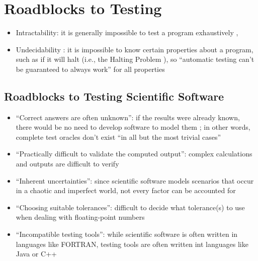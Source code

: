 \section{Roadblocks to Testing}

\begin{itemize}
      \item Intractability: it is generally impossible to test a program
            exhaustively \cite[p.~421]{van_vliet_software_2000},
            \cite[pp.~439,461]{peters_software_2000}
      \item Undecidability \cite[p.~439]{peters_software_2000}: it is
            impossible to know certain properties about a program, such as if
            it will halt (i.e., the Halting Problem
            \cite[p.~4]{gurfinkel_testing_2017}), so ``automatic testing
            can't be guaranteed to always work'' for all properties
            \cite{nelson_formal_1999} 
\end{itemize}

\subsection{Roadblocks to Testing Scientific Software
      \cite[p.~67]{kanewala_metamorphic_2019}}
\label{chap:notes:sec:sci-testing-roadblocks}
\begin{itemize}
      \item ``Correct answers are often unknown'': if the results were already
            known, there would be no need to develop software to model them
            \cite[p.~67]{kanewala_metamorphic_2019}; in other words, complete
            test oracles don't exist ``in all but the most trivial cases''
            \cite[p.~510]{barr_oracle_2015}
      \item ``Practically difficult to validate the computed output'': complex
            calculations and outputs are difficult to verify
            \cite[p.~67]{kanewala_metamorphic_2019}
      \item ``Inherent uncertainties'': since scientific software models
            scenarios that occur in a chaotic and imperfect world, not every
            factor can be accounted for \cite[p.~67]{kanewala_metamorphic_2019}
      \item ``Choosing suitable tolerances'': difficult to decide what
            tolerance(s) to use when dealing with floating-point numbers
            \cite[p.~67]{kanewala_metamorphic_2019}
      \item ``Incompatible testing tools'': while scientific software is often
            written in languages like FORTRAN, testing tools are often written
            int languages like Java or C++ \cite[p.~67]{kanewala_metamorphic_2019}
\end{itemize}

